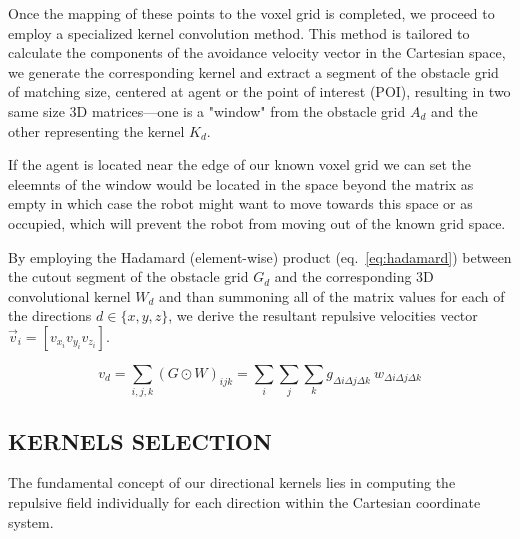 \documentclass[letterpaper, 10 pt, conference]{ieeeconf}  %
\begin{document}
Once the mapping of these points to the voxel grid is completed, we proceed to employ a specialized kernel convolution method. This method is tailored to calculate the components of the avoidance velocity vector in the Cartesian space, we generate the corresponding kernel and extract a segment of the obstacle grid of matching size, centered at agent or the point of interest (POI), resulting in two same size 3D matrices—one is a "window" from the obstacle grid $A_d$ and the other representing the kernel $K_d$.

If the agent is located near the edge of our known voxel grid we can set the eleemnts of the window would be located in the space beyond the matrix as empty in which case the robot might want to move towards this space or as occupied, which will prevent the robot from moving out of the known grid space.

By employing the Hadamard (element-wise) product (eq.~\ref{eq:hadamard}) between the cutout segment of the obstacle grid \(G_d\) and the corresponding 3D convolutional kernel \(W_d\) and than summoning all of the matrix values for each of the directions $d \in \{x, y, z\}$, we derive the resultant repulsive velocities vector \( \vec{v}_i = \left[ v_{x_i} v_{y_i} v_{z_i}\right] \).


\begin{equation}
	v_d = \sum_{i,j,k} (G \odot W)_{ijk} = \sum_{i}\sum_{j}\sum_{k} g_{\Delta i \Delta j \Delta k} ~  w_{\Delta i \Delta j \Delta k}
\end{equation}


%
%



\subsection{KERNELS SELECTION}

The fundamental concept of our directional kernels lies in computing the repulsive field individually for each direction within the Cartesian coordinate system. 
\end{document}
